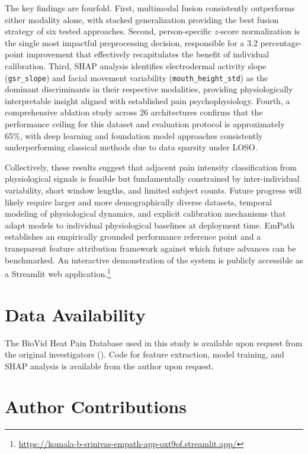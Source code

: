 \documentclass[10pt, twocolumn]{article}
\begin{document}
The key findings are fourfold. First, multimodal fusion consistently outperforms either
modality alone, with stacked generalization providing the best fusion strategy of six
tested approaches. Second, person-specific $z$-score normalization is the single most
impactful preprocessing decision, responsible for a 3.2 percentage-point improvement that
effectively recapitulates the benefit of individual calibration. Third, SHAP analysis
identifies electrodermal activity slope (\texttt{gsr\_slope}) and facial movement
variability (\texttt{mouth\_height\_std}) as the dominant discriminants in their respective
modalities, providing physiologically interpretable insight aligned with established pain
psychophysiology. Fourth, a comprehensive ablation study across 26 architectures confirms
that the performance ceiling for this dataset and evaluation protocol is approximately 65\%,
with deep learning and foundation model approaches consistently underperforming classical
methods due to data sparsity under LOSO.

Collectively, these results suggest that adjacent pain intensity classification from
physiological signals is feasible but fundamentally constrained by inter-individual
variability, short window lengths, and limited subject counts. Future progress will likely
require larger and more demographically diverse datasets, temporal modeling of physiological
dynamics, and explicit calibration mechanisms that adapt models to individual physiological
baselines at deployment time. EmPath establishes an empirically grounded performance
reference point and a transparent feature attribution framework against which future
advances can be benchmarked. An interactive demonstration of the system is publicly
accessible as a Streamlit web application.\footnote{\url{https://komala-b-srinivas-empath-app-oxt9of.streamlit.app/}}

\section*{Data Availability}

The BioVid Heat Pain Database used in this study is available upon request from the
original investigators (\cite{Walter2013}). Code for feature extraction, model training,
and SHAP analysis is available from the author upon request.

\section*{Author Contributions}
\end{document}
